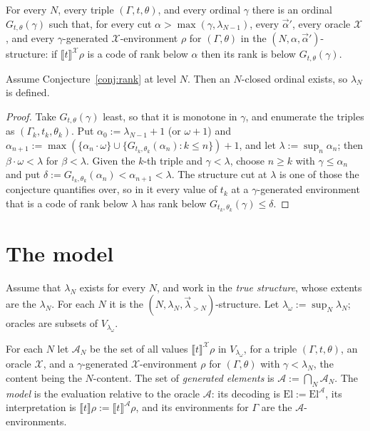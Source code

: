 \documentclass[10pt]{article}
\newcommand{\sem}[1]{\llbracket #1\rrbracket}
\newcommand{\El}{\mathrm{El}}
\newcommand{\X}{\mathcal{X}}
\newcommand{\A}{\mathcal{A}}
\begin{document}
\begin{conjecture}\label{conj:rank}
For every $N$, every triple $(\Gamma,t,\theta)$, and every ordinal
$\gamma$ there is an ordinal $G_{t,\theta}(\gamma)$ such that, for every cut
$\alpha>\max(\gamma,\lambda_{N-1})$, every $\vec\alpha'$, every oracle $\X$,
and every $\gamma$-generated $\X$-environment $\rho$ for $(\Gamma,\theta)$ in
the $(N,\alpha,\vec\alpha')$-structure: if $\sem t^\X\rho$ is a code of
rank below $\alpha$ then its rank is below $G_{t,\theta}(\gamma)$.
\end{conjecture}

\begin{lemma}\label{lem:closedex}
Assume Conjecture~\ref{conj:rank} at level $N$. Then an $N$-closed
ordinal exists, so $\lambda_N$ is defined.
\end{lemma}
\begin{proof}
Take $G_{t,\theta}(\gamma)$ least, so that it is monotone in $\gamma$, and
enumerate the triples as $(\Gamma_k,t_k,\theta_k)$. Put
$\alpha_0:=\lambda_{N-1}+1$ (or $\omega+1$) and
$\alpha_{n+1}:=\max(\{\alpha_n\cdot\omega\}\cup\{G_{t_k,\theta_k}(\alpha_n):k\le n\})+1$,
and let $\lambda:=\sup_n\alpha_n$; then $\beta\cdot\omega<\lambda$ for
$\beta<\lambda$. Given the $k$-th triple and $\gamma<\lambda$, choose
$n\ge k$ with $\gamma\le\alpha_n$ and put
$\delta:=G_{t_k,\theta_k}(\alpha_n)<\alpha_{n+1}<\lambda$. The structure
cut at $\lambda$ is one of those the conjecture quantifies over, so in
it every value of $t_k$ at a $\gamma$-generated environment that is a
code of rank below $\lambda$ has rank below
$G_{t_k,\theta_k}(\gamma)\le\delta$.
\end{proof}

\section{The model}\label{sec:model}

Assume that $\lambda_N$ exists for every $N$, and work in the \emph{true
structure}, whose extents are the $\lambda_N$. For each $N$ it is the
$(N,\lambda_N,\vec\lambda_{>N})$-structure. Let
$\lambda_\omega:=\sup_N\lambda_N$; oracles are subsets of
$V_{\lambda_\omega}$.

\begin{definition}\label{def:A}
For each $N$ let $\A_N$ be the set of all values $\sem t^\X\rho$ in
$V_{\lambda_\omega}$, for a triple $(\Gamma,t,\theta)$, an oracle $\X$, and
a $\gamma$-generated $\X$-environment $\rho$ for $(\Gamma,\theta)$ with
$\gamma<\lambda_N$, the content being the $N$-content. The set of
\emph{generated elements} is $\A:=\bigcap_N\A_N$. The \emph{model} is the
evaluation relative to the oracle $\A$: its decoding is $\El:=\El^{\A}$,
its interpretation is $\sem t\rho:=\sem t^{\A}\rho$, and its environments
for $\Gamma$ are the $\A$-environments.
\end{definition}
\end{document}
